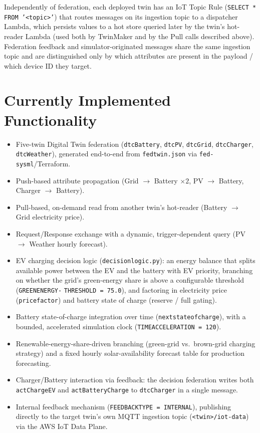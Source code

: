 \documentclass[11pt]{article}
\renewcommand{\_}{\textunderscore\allowbreak}
\begin{document}
Independently of federation, each deployed twin has an IoT Topic Rule
(\texttt{SELECT * FROM '<topic>'}) that routes messages on its ingestion
topic to a dispatcher Lambda, which persists values to a hot store queried
later by the twin's hot-reader Lambda (used both by TwinMaker and by the
Pull calls described above). Federation feedback and simulator-originated
messages share the same ingestion topic and are distinguished only by which
attributes are present in the payload / which device ID they target.

\section{Currently Implemented Functionality}

\begin{itemize}[nosep]
  \item Five-twin Digital Twin federation (\texttt{dtcBattery},
        \texttt{dtcPV}, \texttt{dtcGrid}, \texttt{dtcCharger},
        \texttt{dtcWeather}), generated end-to-end from \texttt{fedtwin.json}
        via \texttt{fed-sysml}/Terraform.
  \item Push-based attribute propagation (Grid $\rightarrow$ Battery
        $\times 2$, PV $\rightarrow$ Battery, Charger $\rightarrow$
        Battery).
  \item Pull-based, on-demand read from another twin's hot-reader
        (Battery $\rightarrow$ Grid electricity price).
  \item Request/Response exchange with a dynamic, trigger-dependent query
        (PV $\rightarrow$ Weather hourly forecast).
  \item EV charging decision logic (\texttt{decision\_logic.py}): an energy
        balance that splits available power between the EV and the battery
        with EV priority, branching on whether the grid's green-energy
        share is above a configurable threshold (\texttt{GREEN\_ENERGY\_-}
        \texttt{THRESHOLD = 75.0}), and factoring in electricity price
        (\texttt{price\_factor}) and battery state of charge (reserve /
        full gating).
  \item Battery state-of-charge integration over time
        (\texttt{next\_state\_of\_charge}), with a bounded, accelerated
        simulation clock (\texttt{TIME\_ACCELERATION = 120}).
  \item Renewable-energy-share-driven branching (green-grid vs.\ brown-grid
        charging strategy) and a fixed hourly solar-availability forecast
        table for production forecasting.
  \item Charger/Battery interaction via feedback: the decision federation
        writes both \texttt{actChargeEV} and \texttt{actBatteryCharge} to
        \texttt{dtcCharger} in a single message.
  \item Internal feedback mechanism (\texttt{FEEDBACK\_TYPE = INTERNAL}),
        publishing directly to the target twin's own MQTT ingestion topic
        (\texttt{<twin>/iot-data}) via the AWS IoT Data Plane.
\end{itemize}
\end{document}
